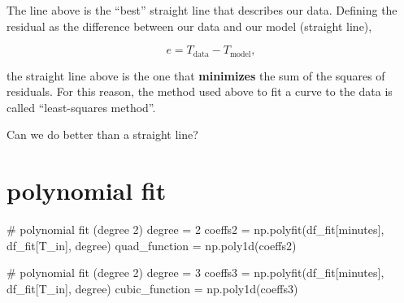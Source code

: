 \documentclass[
  letterpaper,
  DIV=11,
  numbers=noendperiod,
  oneside]{scrreprt}
\newenvironment{Shaded}{\begin{snugshade}}{\end{snugshade}}
\newcommand{\CommentTok}[1]{\textcolor[rgb]{0.37,0.37,0.37}{#1}}
\newcommand{\DecValTok}[1]{\textcolor[rgb]{0.68,0.00,0.00}{#1}}
\newcommand{\NormalTok}[1]{\textcolor[rgb]{0.00,0.23,0.31}{#1}}
\newcommand{\OperatorTok}[1]{\textcolor[rgb]{0.37,0.37,0.37}{#1}}
\newcommand{\StringTok}[1]{\textcolor[rgb]{0.13,0.47,0.30}{#1}}
\begin{document}
The line above is the ``best'' straight line that describes our data.
Defining the residual as the difference between our data and our model
(straight line),

\[
e = T_{\text{data}} - T_{\text{model}},
\]

the straight line above is the one that \textbf{minimizes} the sum of
the squares of residuals. For this reason, the method used above to fit
a curve to the data is called ``least-squares method''.


Can we do better than a straight line?

\hypertarget{polynomial-fit}{%
\section{polynomial fit}\label{polynomial-fit}}

\begin{Shaded}
\begin{Highlighting}[]
\CommentTok{\# polynomial fit (degree 2)}
\NormalTok{degree }\OperatorTok{=} \DecValTok{2}
\NormalTok{coeffs2 }\OperatorTok{=}\NormalTok{ np.polyfit(df\_fit[}\StringTok{\textquotesingle{}minutes\textquotesingle{}}\NormalTok{], df\_fit[}\StringTok{\textquotesingle{}T\_in\textquotesingle{}}\NormalTok{], degree)}
\NormalTok{quad\_function }\OperatorTok{=}\NormalTok{ np.poly1d(coeffs2)}

\CommentTok{\# polynomial fit (degree 2)}
\NormalTok{degree }\OperatorTok{=} \DecValTok{3}
\NormalTok{coeffs3 }\OperatorTok{=}\NormalTok{ np.polyfit(df\_fit[}\StringTok{\textquotesingle{}minutes\textquotesingle{}}\NormalTok{], df\_fit[}\StringTok{\textquotesingle{}T\_in\textquotesingle{}}\NormalTok{], degree)}
\NormalTok{cubic\_function }\OperatorTok{=}\NormalTok{ np.poly1d(coeffs3)}
\end{Highlighting}
\end{Shaded}
\end{document}

